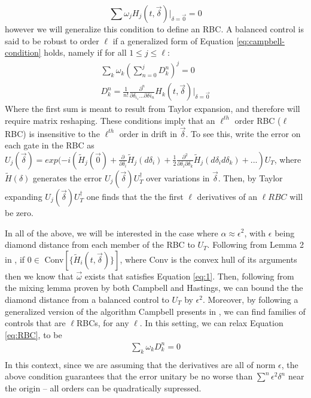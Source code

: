 \documentclass[aps,nofootinbib,pra,notitlepage,twocolumn]{revtex4-1}
\begin{document}
\begin{equation}\label{eq:campbell-condition}
\sum \omega_j H_j(t, \vec{\delta})|_{\delta=\vec{0}} = 0
\end{equation}
however we will generalize this condition to define an RBC. A balanced control is said to be robust to order $\ell$ if a generalized form of Equation \ref{eq:campbell-condition} holds, namely if for all $1 \leq j \leq \ell$:
\begin{equation}\label{eq:RBC}
\begin{gathered}
\sum_k\omega_k(\sum_{n=0}^j D^n_k)^j = 0\\
D^n_k = \frac{1}{n!}\frac{\partial^{n}}{\partial\delta_{i_1}...\partial\delta{i_n}}H_k(t,\vec{\delta})|_{\delta=\vec{0}}
\end{gathered}
\end{equation}
Where the first sum is meant to result from Taylor expansion, and therefore will require matrix reshaping. These conditions imply that an $\ell^{th}$ order RBC ($\ell$RBC) is insensitive to the $\ell^{th}$ order in drift in $\vec{\delta}$. To see this, write the error on each gate in the RBC as $U_j(\vec{\delta}) = exp(-i(\tilde{H}_j(\vec{0}) + \frac{\partial}{\partial\delta_i}\tilde{H}_j(d\delta_i) +  \frac{1}{2}\frac{\partial^2}{\partial\delta_i\partial\delta_k} \tilde{H}_j(d\delta_i d\delta_k) + ...)U_T$, where $\tilde{H}(\delta)$ generates the error $U_j(\vec{\delta})U_T^{\dagger}$ over variations in $\vec{\delta}$. Then, by Taylor expanding $U_j(\vec{\delta})U_T^{\dagger}$ one finds that the the first $\ell$ derivatives of an $\ell RBC$ will be zero.

In all of the above, we will be interested in the case where $\alpha \approx \epsilon^2$, with $\epsilon$ being diamond distance from each member of the RBC to $U_T$. Following from Lemma 2 in \cite{Campbell2017}, if $0\in $ Conv$[\{\tilde{H}_i(t, \vec{\delta})\}]$, where Conv is the convex hull of its arguments then we know that $\vec{\omega}$ exists that satisfies Equation \ref{eq:1}. Then, following from the mixing lemma proven by both Campbell and Hastings\cite{1612.01011}, we can bound the the diamond distance from a balanced control to $U_T$ by $\epsilon^2$. Moreover, by following a generalized version of the algorithm Campbell presents in \cite{Campbell2017}, we can find families of controls that are $\ell$RBCs, for any $\ell$. In this setting, we can relax Equation \ref{eq:RBC}, to be
\begin{equation}\label{eq:RBC-relaxed}
\begin{gathered}
\sum_k\omega_kD^n_k = 0\\
\end{gathered}
\end{equation}
In this context, since we are assuming that the derivatives are all of norm $\epsilon$, the above condition guarantees that the error unitary be no worse than $\sum^n\epsilon^2\delta^n$ near the origin -- all orders can be quadratically supressed.
\end{document}
